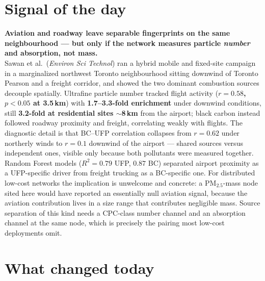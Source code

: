 \documentclass[10pt]{article}
\begin{document}
\vspace{6mm}

\section*{\sffamily\bfseries\color{Deep}Signal of the day}
\vspace{-1.5mm}{\color{Amber}\rule{\linewidth}{1.1pt}}\vspace{2.5mm}

\begin{keybox}
{\sffamily\bfseries\small\color{Deep}Aviation and roadway leave separable fingerprints on
the same neighbourhood --- but only if the network measures particle \emph{number} and
absorption, not mass.}\\[1.4mm]
\footnotesize
Sawan et al.\ (\textit{Environ Sci Technol}) ran a hybrid mobile and fixed-site campaign in
a marginalized northwest Toronto neighbourhood sitting downwind of Toronto Pearson and a
freight corridor, and showed the two dominant combustion sources decouple spatially.
Ultrafine particle number tracked flight activity (\textbf{$r=0.58$, $p<0.05$ at 3.5\,km})
with \textbf{1.7--3.3-fold enrichment} under downwind conditions, still
\textbf{3.2-fold at residential sites $\sim$8\,km} from the airport; black carbon instead
followed roadway proximity and freight, correlating weakly with flights. The diagnostic
detail is that BC--UFP correlation collapses from $r=0.62$ under northerly winds to
$r=0.1$ downwind of the airport --- shared sources versus independent ones, visible only
because both pollutants were measured together. Random Forest models
($R^2=0.79$ UFP, $0.87$ BC) separated airport proximity as a UFP-specific driver from
freight trucking as a BC-specific one. For distributed low-cost networks the implication
is unwelcome and concrete: a PM$_{2.5}$-mass node sited here would have reported an
essentially null aviation signal, because the aviation contribution lives in a size range
that contributes negligible mass. Source separation of this kind needs a CPC-class number
channel and an absorption channel at the same node, which is precisely the pairing most
low-cost deployments omit.
\end{keybox}

\vspace{3mm}

\section*{\sffamily\bfseries\color{Deep}What changed today}
\vspace{-1.5mm}{\color{Amber}\rule{\linewidth}{1.1pt}}\vspace{2.5mm}
\end{document}
